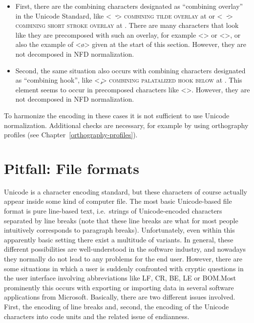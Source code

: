 \begin{itemize}
  
  \item First, there are the combining characters designated as ``combining
        overlay'' in the Unicode Standard, like <\ \ {\large ̴}>
        \textsc{combining tilde overlay} at  or <\ \ {\large ̵}>
        \textsc{combining short stroke overlay} at . There are many
        characters that look like they are precomposed with such an overlay,
        for example <> or <>, or also the
        example of <ø> given at the start of this section. However, they are 
        not decomposed in NFD normalization.
  \item Second, the same situation also occurs with combining characters
        designated as ``combining hook'', like < {\large ̡}> \textsc{combining
        palatalized hook below} at . This element seems to occur in
        precomposed characters like <>. However, they are 
        not decomposed in NFD normalization.
        
\end{itemize}

To harmonize the encoding in these cases it is not sufficient to use Unicode 
normalization. Additional checks are necessary, for example by using orthography 
profiles (see Chapter~\ref{orthography-profiles}).

\section{Pitfall: File formats}
\label{pitfall-file-formats}

Unicode is a character encoding standard, but these characters of course
actually appear inside some kind of computer file. The most basic Unicode-based file
format is pure line-based text, i.e.~strings of Unicode-encoded characters
separated by line breaks (note that these line breaks are what for most people
intuitively corresponds to paragraph breaks). Unfortunately, even within this
apparently basic setting there exist a multitude of variants. In general, these
different possibilities are well-understood in the software industry, and
nowadays they normally do not lead to any problems for the end user. However,
there are some situations in which a user is suddenly confronted with cryptic
questions in the user interface involving abbreviations like LF, CR, BE, LE or
BOM.\@ Most prominently this occurs with exporting or importing data in several
software applications from Microsoft. Basically, there are two different issues
involved. First, the encoding of line breaks and, second, the encoding of the
Unicode characters into code units and the related issue of endianness.

